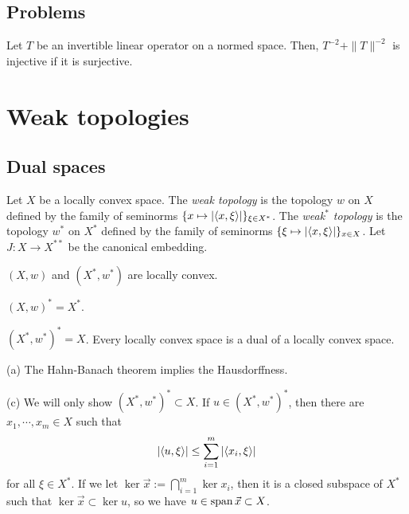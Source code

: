 \documentclass{../../large}
\begin{document}
\section*{Problems}
\begin{prb}
Let $T$ be an invertible linear operator on a normed space.
Then, $T^{-2}+\|T\|^{-2}$ is injective if it is surjective.
\end{prb}
















\chapter{Weak topologies}
\section{Dual spaces}

\begin{prb}[Bidual]
\end{prb}

\begin{prb}
Let $X$ be a locally convex space.
The \emph{weak topology} is the topology $w$ on $X$ defined by the family of seminorms $\{x\mapsto|\langle x,\xi\rangle|\}_{\xi\in X^*}$.
The \emph{weak$^*$ topology} is the topology $w^*$ on $X^*$ defined by the family of seminorms $\{\xi\mapsto|\langle x,\xi\rangle|\}_{x\in X}$.
Let $J:X\to X^{**}$ be the canonical embedding.
\begin{parts}
\item $(X,w)$ and $(X^*,w^*)$ are locally convex.
\item $(X,w)^*=X^*$.
\item $(X^*,w^*)^*=X$. Every locally convex space is a dual of a locally convex space.
\end{parts}
\end{prb}
\begin{pf}
(a)
The Hahn-Banach theorem implies the Hausdorffness.

(c)
We will only show $(X^*,w^*)^*\subset X$.
If $u\in(X^*,w^*)^*$, then there are $x_1,\cdots,x_m\in X$ such that
\[|\langle u,\xi\rangle|\le\sum_{i=1}^m|\langle x_i,\xi\rangle|\]
for all $\xi\in X^*$.
If we let $\ker\vec x:=\bigcap_{i=1}^m\ker x_i$, then it is a closed subspace of $X^*$ such that $\ker\vec x\subset\ker u$, so we have $u\in\operatorname{span}\vec x\subset X$.
\end{pf}
\end{document}
